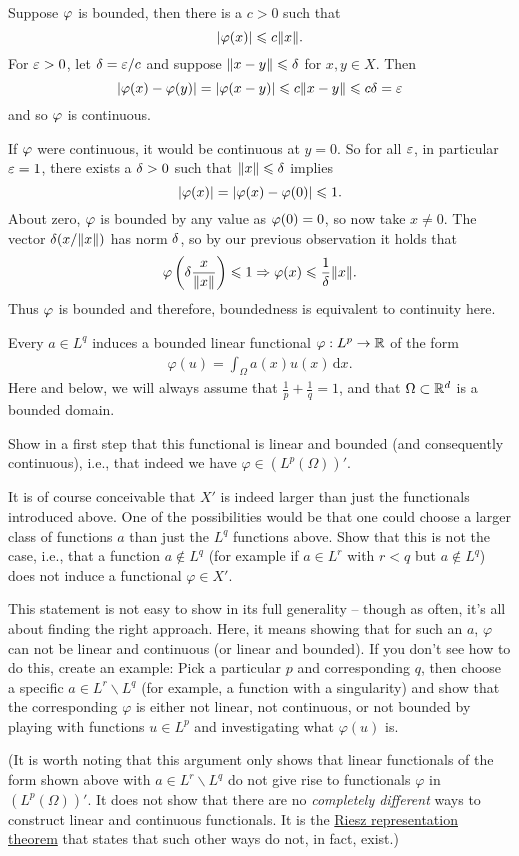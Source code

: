 \documentclass[12pt]{memoir}
\begin{document}
\begin{ptcbr}
  Suppose $\varphi$ is bounded, then there is a $c>0$ such that 
  $$|\varphi(x)|\leqslant c\norm{x}.$$
  For $\varepsilon>0$, let $\delta=\varepsilon/c$ and suppose $\norm{x-y}\leqslant\delta$ for $x,y\in X$. Then 
  $$|\varphi(x)-\varphi(y)|=|\varphi(x-y)|\leqslant c\norm{x-y}\leqslant c\delta=\varepsilon$$
  and so $\varphi$ is continuous.\par 
  If $\varphi$ were continuous, it would be continuous at $y=0$. So for all $\varepsilon$, in particular $\varepsilon=1$, there exists a $\delta>0$ such that $\norm{x}\leqslant\delta$ implies 
  $$|\varphi(x)|=|\varphi(x)-\varphi(0)|\leqslant 1.$$
  About zero, $\varphi$ is bounded by any value as $\varphi(0)=0$, so now take $x\neq 0$. The vector $\delta(x/\norm{x})$ has norm $\delta$, so by our previous observation it holds that
  $$\varphi\left(\delta\frac{x}{\norm{x}}\right)\leqslant 1\Rightarrow \varphi(x)\leqslant\frac{1}{\delta}\norm{x}.$$
  Thus $\varphi$ is bounded and therefore, boundedness is equivalent to continuity here.
\end{ptcbr}
\begin{Ej}
    Every $a\in L^q$ induces a
bounded linear functional $\varphi:L^p\rightarrow \mathbb{R}$ of the form
\begin{align*}
  \varphi(u) = \int_\Omega a(x) u(x) \, \text{d}x.
\end{align*}
Here and below, we will always assume that $\frac 1p + \frac 1q = 1$,
and that $\Omega\subset\mathbb{R}^d$ is a bounded domain.

Show in a first step that this functional is linear and bounded (and
consequently continuous), i.e., that indeed we have $\varphi\in (L^p(\Omega))'$.

It is of course conceivable that $X'$ is indeed larger than just the
functionals introduced above. One of the possibilities would be that
one could choose a larger class of functions $a$ than just the $L^q$
functions above. Show that this is not the case, i.e., that a function
$a\not\in L^q$ (for example if $a\in L^r$ with $r<q$ but $a\not\in
L^q$) does not induce a functional $\varphi\in X'$.

This statement is not easy to show in its full generality -- though as
often, it's all about finding the right approach. Here, it means
showing that for such an $a$, $\varphi$ can not be linear and
continuous (or linear and bounded). If you
don't see how to do this, create an example: Pick a particular $p$ and
corresponding $q$, then choose a specific $a\in L^r\backslash L^q$
(for example, a function with a singularity) and show that the
corresponding $\varphi$ is either not linear, not continuous, or not
bounded by playing with functions $u\in L^p$ and investigating what
$\varphi(u)$ is.

(It is worth noting that this argument only shows that linear
functionals of the form shown above with $a \in L^r\backslash L^q$ do
not give rise to functionals $\varphi$ in $(L^p(\Omega))'$. It does
not show that there are no \textit{completely different} ways to
construct linear and continuous functionals. It is the
\href{https://en.wikipedia.org/wiki/Riesz_representation_theorem}{Riesz
representation
theorem}
that states that such other ways do not, in fact, exist.)
\end{Ej}
\end{document}

